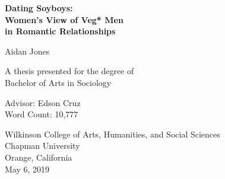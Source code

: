 \begin{titlepage}
\pagecolor{beige}
   \begin{center}
       \vspace*{1cm}
 
       {\selectfont\bfseries\Large
       {\Huge Dating Soyboys:} \\Women's View of Veg* Men\\in Romantic Relationships}
       \vspace{1.5cm}
 
       \begin{large}
       {Aidan Jones}
       \end{large}
 
       \vfill
 
       A thesis presented for the degree of\\
       Bachelor of Arts in Sociology
 
       \vspace{0.8cm}
       
       Advisor: Edson Cruz\\
       Word Count: 10,777
 
    \vspace{0.8cm} 
 
       Wilkinson College of Arts, Humanities, and Social Sciences\\
       Chapman University\\
       Orange, California\\
       May 6, 2019
       
   \end{center}
\end{titlepage}